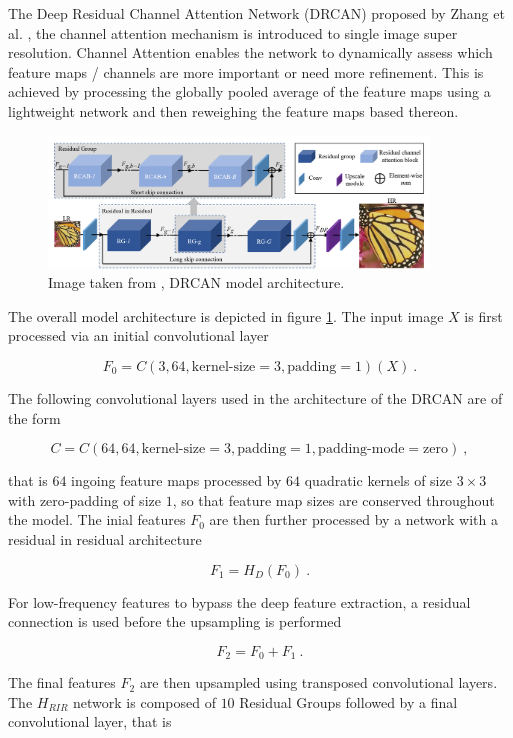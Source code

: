 The Deep Residual Channel Attention Network (DRCAN) proposed by Zhang et al. \cite{zhangImageSuperResolutionUsing2018}, 
the channel attention mechanism is introduced to single image super resolution.
Channel Attention enables the network to dynamically assess which feature maps / channels are more important or need more refinement.
This is achieved by processing the globally pooled average of the feature maps using a lightweight network
and then reweighing the feature maps based thereon.

\begin{figure}[h!]
    \includegraphics[width=0.9\textwidth]{models/sisr/imgs/drcan_model.png}
    \caption{Image taken from \cite{zhangImageSuperResolutionUsing2018}, DRCAN model architecture.}
    \label{fig:drcan_model}
\end{figure}

The overall model architecture is depicted in figure \ref{fig:drcan_model}.
The input image $X$ is first processed via an initial convolutional layer

    $$ F_0 = C(3, 64, \text{kernel-size}=3, \text{padding}=1)(X) ~. $$

The following convolutional layers used in the architecture of the DRCAN are of the form    

    $$ C = C(64, 64, \text{kernel-size}=3, \text{padding}=1, \text{padding-mode}=\text{zero}) ~, $$

that is $64$ ingoing feature maps processed by $64$ quadratic kernels of size $3 \times 3$ with zero-padding of size $1$, 
so that feature map sizes are conserved throughout the model.
The inial features $F_0$ are then further processed by a network with a residual in residual architecture

    $$ F_{1} = H_{D}(F_0) ~. $$

For low-frequency features to bypass the deep feature extraction, 
a residual connection is used before the upsampling is performed

    $$F_2 = F_0 + F_1 ~.$$

The final features $F_2$ are then upsampled using transposed convolutional layers. \newline
The $H_{RIR}$ network is composed of $10$ Residual Groups followed by a final convolutional layer, 
that is 

